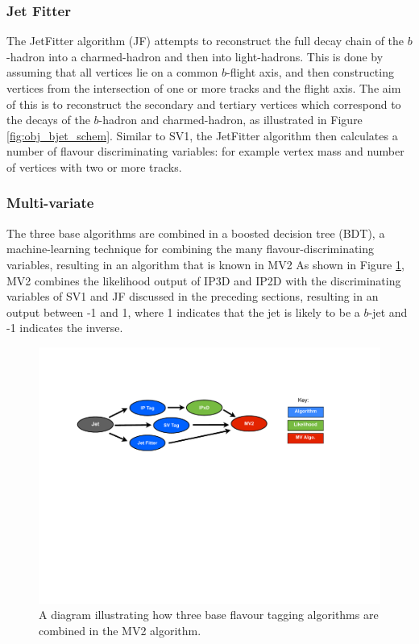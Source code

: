    \subsubsection{Jet Fitter}
   \label{sec:obj-bjets_JF}

   The JetFitter algorithm (JF) attempts to reconstruct the full decay chain of the $b$-hadron into a charmed-hadron and then into light-hadrons. 
   This is done by assuming that all vertices lie on a common $b$-flight axis, and then constructing vertices from the intersection of
   one or more tracks and the flight axis.
   The aim of this is to reconstruct the secondary and tertiary vertices which correspond to the decays of the $b$-hadron and charmed-hadron,
   as illustrated in Figure \ref{fig:obj_bjet_schem}.
   Similar to SV1, the JetFitter algorithm then calculates a number of flavour discriminating variables:
   for example vertex mass and number of vertices with two or more tracks.
   
   \subsubsection{Multi-variate}
   \label{sec:obj-bjets_MV2}

   The three base algorithms are combined in a boosted decision tree (BDT), a machine-learning technique for combining the many flavour-discriminating variables,
   resulting in an algorithm that is known in MV2
   As shown in Figure \ref{fig:obj-MV2_schem}, MV2 combines the likelihood output of IP3D and IP2D
   with the discriminating variables of SV1 and JF discussed in the preceding sections,
   resulting in an output between -1 and 1, where 1 indicates that the jet is likely to be a $b$-jet and -1 indicates the inverse.
   
   \begin{figure}[!htb]
     \begin{center}
       \includegraphics[width=1.0\textwidth]{figs/Objects/MV2_schem.pdf}
       \caption{A diagram illustrating how three base flavour tagging algorithms are combined in the MV2 algorithm.}
       \label{fig:obj-MV2_schem}
     \end{center}
     \vspace{-1cm}
   \end{figure}
   
